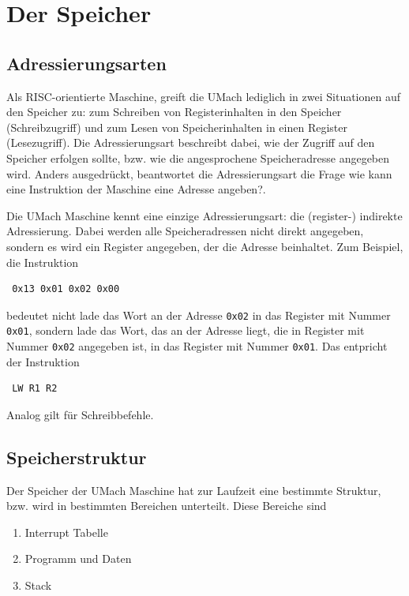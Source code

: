 \section{Der Speicher}
\label{sec:Speicher}

\subsection{Adressierungsarten}
\label{subsec:Adressierungsarten}

Als RISC-orientierte Maschine, greift die UMach lediglich in zwei Situationen
auf den Speicher zu: zum Schreiben von Registerinhalten in den Speicher
(Schreibzugriff) und zum Lesen von Speicherinhalten in einen Register
(Lesezugriff).  Die \gls{Adressierungsart} beschreibt dabei, wie der Zugriff
auf den Speicher erfolgen sollte, bzw. wie die angesprochene Speicheradresse
angegeben wird. Anders ausgedrückt, beantwortet die Adressierungsart die Frage
\glqq wie kann eine Instruktion der Maschine eine Adresse angeben?\grqq. 

Die UMach Maschine kennt eine einzige Adressierungsart: die (register-)
indirekte Adressierung. Dabei werden alle Speicheradressen nicht direkt
angegeben, sondern es wird ein Register angegeben, der die Adresse beinhaltet.
Zum Beispiel, die Instruktion 
\begin{lstlisting}
 0x13 0x01 0x02 0x00
\end{lstlisting}
bedeutet nicht \glqq lade das Wort an der Adresse \texttt{0x02} in das Register
mit Nummer \texttt{0x01}\grqq, sondern \glqq lade das Wort, das an der Adresse
liegt, die in Register mit Nummer \texttt{0x02} angegeben ist, in das Register
mit Nummer \texttt{0x01}\grqq. Das entpricht der Instruktion
\begin{lstlisting}
 LW R1 R2
\end{lstlisting}
Analog gilt für Schreibbefehle.


\subsection{Speicherstruktur}

Der Speicher der UMach Maschine hat zur Laufzeit eine bestimmte Struktur, bzw.
wird in bestimmten Bereichen unterteilt. Diese Bereiche sind
\begin{enumerate}
 \item Interrupt Tabelle
 \item Programm und Daten
 \item Stack
\end{enumerate}

